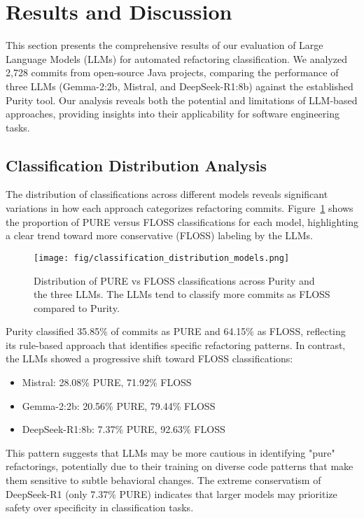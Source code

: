 \section{Results and Discussion}

This section presents the comprehensive results of our evaluation of Large Language Models (LLMs) for automated refactoring classification. We analyzed 2,728 commits from open-source Java projects, comparing the performance of three LLMs (Gemma-2:2b, Mistral, and DeepSeek-R1:8b) against the established Purity tool. Our analysis reveals both the potential and limitations of LLM-based approaches, providing insights into their applicability for software engineering tasks.

\subsection{Classification Distribution Analysis}

The distribution of classifications across different models reveals significant variations in how each approach categorizes refactoring commits. Figure~\ref{fig:classification-distribution} shows the proportion of PURE versus FLOSS classifications for each model, highlighting a clear trend toward more conservative (FLOSS) labeling by the LLMs.

\begin{figure}[H]
\centering
\texttt{[image: fig/classification\_distribution\_models.png]}
\caption{Distribution of PURE vs FLOSS classifications across Purity and the three LLMs. The LLMs tend to classify more commits as FLOSS compared to Purity.}
\label{fig:classification-distribution}
\end{figure}

Purity classified 35.85\% of commits as PURE and 64.15\% as FLOSS, reflecting its rule-based approach that identifies specific refactoring patterns. In contrast, the LLMs showed a progressive shift toward FLOSS classifications:
\begin{itemize}
    \item Mistral: 28.08\% PURE, 71.92\% FLOSS
    \item Gemma-2:2b: 20.56\% PURE, 79.44\% FLOSS
    \item DeepSeek-R1:8b: 7.37\% PURE, 92.63\% FLOSS
\end{itemize}

This pattern suggests that LLMs may be more cautious in identifying "pure" refactorings, potentially due to their training on diverse code patterns that make them sensitive to subtle behavioral changes. The extreme conservatism of DeepSeek-R1 (only 7.37\% PURE) indicates that larger models may prioritize safety over specificity in classification tasks.

